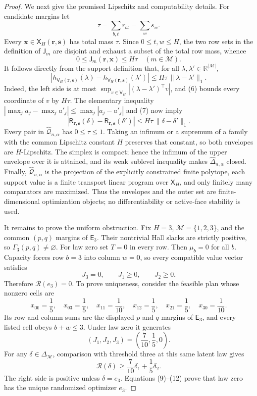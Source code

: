 \documentclass{article}
\begin{document}
\begin{proof}
We next give the promised Lipschitz and computability details.  For candidate margins let
\[
 \tau=\sum_{b,t}r_{bt}=\sum_ws_w.
\]
Every \(\mathbf x\in\mathsf X_H(\mathbf r,\mathbf s)\) has total mass \(\tau\).  Since \(0\le t,w\le H\), the two row sets in the definition of \(\mathsf J_m\) are disjoint and exhaust a subset of the total row mass, whence
\[
 0\le \mathsf J_m(\mathbf r,\mathbf x)\le H\tau
 \quad(m\in\mathcal M).                                 \tag{6}
\]
It follows directly from the support definition that, for all \(\lambda,\lambda'\in\mathbb R^{|\mathcal M|}\),
\[
 \left|h_{\mathsf V_H(\mathbf r,\mathbf s)}(\lambda)
       -h_{\mathsf V_H(\mathbf r,\mathbf s)}(\lambda')\right|
 \le H\tau\,\|\lambda-\lambda'\|_1.                    \tag{7}
\]
Indeed, the left side is at most \(\sup_{v\in\mathsf V_H}|(\lambda-\lambda')^\top v|\), and (6) bounds every coordinate of \(v\) by \(H\tau\).  The elementary inequality \(|\max_j a_j-\max_j a'_j|\le\max_j|a_j-a'_j|\) and (7) now imply
\[
 |\mathsf R_{\mathbf r,\mathbf s}(\delta)
   -\mathsf R_{\mathbf r,\mathbf s}(\delta')|
 \le H\tau\,\|\delta-\delta'\|_1.                      \tag{8}
\]
Every pair in \(\widehat{\mathcal Q}_{n,\alpha}\) has \(0\le\tau\le1\).  Taking an infimum or a supremum of a family with the common Lipschitz constant \(H\) preserves that constant, so both envelopes are \(H\)-Lipschitz.  The simplex is compact; hence the infimum of the upper envelope over it is attained, and its weak sublevel inequality makes \(\widehat\Delta_{n,\alpha}\) closed.  Finally, \(\widehat{\mathcal Q}_{n,\alpha}\) is the projection of the explicitly constrained finite polytope, each support value is a finite transport linear program over \(\mathsf X_H\), and only finitely many comparators are maximized.  Thus the envelopes and the outer set are finite-dimensional optimization objects; no differentiability or active-face stability is used.

It remains to prove the uniform obstruction.  Fix \(H=3\), \(\mathcal M=\{1,2,3\}\), and the common \((p,q)\) margins of \(\mathsf E_3\).  Their nontrivial Hall slacks are strictly positive, so \(\Gamma_3(p,q)\ne\varnothing\).  For law zero set \(T=0\) in every row.  Then \(\mu_b=0\) for all \(b\).  Capacity forces row \(b=3\) into column \(w=0\), so every compatible value vector satisfies
\[
 J_3=0,
 \qquad J_1\ge0,
 \qquad J_2\ge0.                                        \tag{9}
\]
Therefore \(\mathcal R(e_3)=0\).  To prove uniqueness, consider the feasible plan whose nonzero cells are
\[
 x_{00}=\frac15,\quad x_{03}=\frac15,\quad
 x_{11}=\frac1{10},\quad x_{12}=\frac15,\quad
 x_{21}=\frac15,\quad x_{30}=\frac1{10}.                 \tag{10}
\]
Its row and column sums are the displayed \(p\) and \(q\) margins of \(\mathsf E_3\), and every listed cell obeys \(b+w\le3\).  Under law zero it generates
\[
 (J_1,J_2,J_3)=\left(\frac7{10},\frac15,0\right).        \tag{11}
\]
For any \(\delta\in\Delta_{\mathcal M}\), comparison with threshold three at this same latent law gives
\[
 \mathcal R(\delta)
 \ge \frac7{10}\delta_1+\frac15\delta_2.                \tag{12}
\]
The right side is positive unless \(\delta=e_3\).  Equations (9)--(12) prove that law zero has the unique randomized optimizer \(e_3\).


\end{proof}
\end{document}
